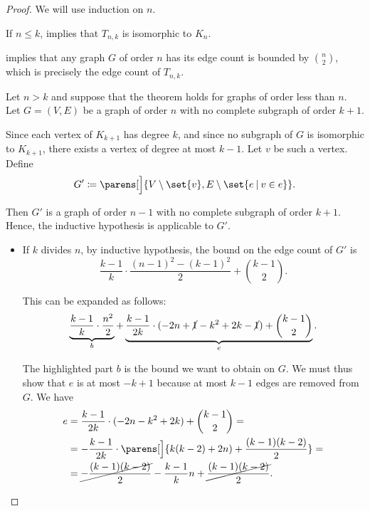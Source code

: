 \begin{proof}
  We will use induction on \( n \).

   If \( n \leq k \),  implies that \( T_{n,k} \) is isomorphic to \( K_n \).

   implies that any graph \( G \) of order \( n \) has its edge count is bounded by \( \binom n 2 \), which is precisely the edge count of \( T_{n,k} \).

   Let \( n > k \) and suppose that the theorem holds for graphs of order less than \( n \). Let \( G = (V, E) \) be a graph of order \( n \) with no complete subgraph of order \( k + 1 \).

  Since each vertex of \( K_{k+1} \) has degree \( k \), and since no subgraph of \( G \) is isomorphic to \( K_{k+1} \), there exists a vertex of degree at most \( k - 1 \). Let \( v \) be such a vertex. Define
  \begin{equation*}
    G' \coloneqq \parens[\Big]{ V \setminus \set{ v }, E \setminus \set{ e \given v \in e } }.
  \end{equation*}

  Then \( G' \) is a graph of order \( n - 1 \) with no complete subgraph of order \( k + 1 \). Hence, the inductive hypothesis is applicable to \( G' \).
  \begin{itemize}
    \item If \( k \) divides \( n \), by inductive hypothesis, the bound on the edge count of \( G' \) is
    \begin{equation*}
      \frac {k - 1} k \cdot \frac {(n - 1)^2 - (k - 1)^2} 2 + \binom {k - 1} 2.
    \end{equation*}

    This can be expanded as follows:
    \begin{equation*}
      \underbrace{\frac {k - 1} k \cdot \frac {n^2} 2}_b + \underbrace{\frac {k - 1} {2k} \cdot (-2n + \cancel{1} - k^2 + 2k - \cancel{1}) + \binom {k - 1} 2}_e.
    \end{equation*}

    The highlighted part \( b \) is the bound we want to obtain on \( G \). We must thus show that \( e \) is at most \( -k + 1 \) because at most \( k - 1 \) edges are removed from \( G \). We have
    \begin{align*}
      e
      &=
      \frac {k - 1} {2k} \cdot (-2n - k^2 + 2k) + \binom {k - 1} 2
      = \\ &=
      -\frac {k - 1} {2k} \cdot \parens[\Big]{ k(k - 2) + 2n ) + \frac {(k - 1)(k - 2)} 2 }
      = \\ &=
      \cancel{-\frac {(k - 1)(k - 2)} 2} - \frac {k - 1} k n + \cancel{\frac {(k - 1)(k - 2)} 2}.
    \end{align*}


\end{itemize}
\end{proof}
